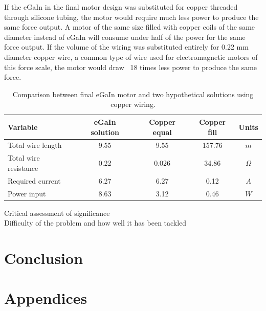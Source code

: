 \documentclass[a4paper,12pt]{article}
\begin{document}
If the eGaIn in the final motor design was substituted for copper threaded through silicone tubing, the motor would require much less power to produce the same force output. A motor of the same size filled with copper coils of the same diameter instead of eGaIn will consume under half of the power for the same force output. If the volume of the wiring was substituted entirely for 0.22 mm diameter copper wire, a common type of wire used for electromagnetic motors of this force scale, the motor would draw ~18 times less power to produce the same force.
\begin{table}[h!]
	\centering
	\caption{Comparison between final eGaIn motor and two hypothetical solutions using copper wiring.}
	\label{tb:coppercompare}
	\begin{tabular}{M | c | c | c | c} 
		\textbf{Variable} & \textbf{eGaIn solution} & \textbf{Copper equal} & \textbf{Copper fill} & \textbf{Units} \\ [0.5ex] 
		\hline\hline
		Total wire length & 9.55 & 9.55 & 157.76 & $m$ \\ 
		\hline
		Total wire resistance & 0.22 & 0.026 & 34.86 & $\Omega$ \\ 
		\hline
		Required current & 6.27 & 6.27 & 0.12 & $A$ \\ 
		\hline
		Power input & 8.63 & 3.12 & 0.46 & $W$ \\ 
		\hline
	\end{tabular}
\end{table}

Critical assessment of significance\\

Difficulty of the problem and how well it has been tackled\\

\newpage

\section{Conclusion}

\newpage

\section{Appendices}
\end{document}
